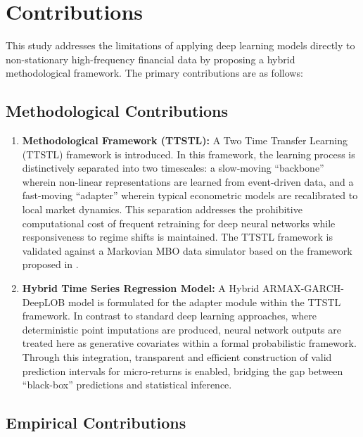 \documentclass[10pt,a4paper,oneside]{article}
\begin{document}
\section{Contributions}
\label{Sect:Contributions}

This study addresses the limitations of applying deep learning models directly to non-stationary high-frequency financial data by proposing a hybrid methodological framework. The primary contributions are as follows:

\subsection{Methodological Contributions}

\begin{enumerate}
    \item \textbf{Methodological Framework (TTSTL):} A Two Time Transfer Learning (TTSTL) framework is introduced. In this framework, the learning process is distinctively separated into two timescales: a slow-moving ``backbone'' wherein non-linear representations are learned from event-driven data, and a fast-moving ``adapter'' wherein typical econometric models are recalibrated to local market dynamics. This separation addresses the prohibitive computational cost of frequent retraining for deep neural networks while responsiveness to regime shifts is maintained. The TTSTL framework is validated against a Markovian MBO data simulator based on the framework proposed in \cite{cont2023mathematical}.

    \item \textbf{Hybrid Time Series Regression Model:} A Hybrid ARMAX-GARCH-DeepLOB model is formulated for the adapter module within the TTSTL framework. In contrast to standard deep learning approaches, where deterministic point imputations are produced, neural network outputs are treated here as generative covariates within a formal probabilistic framework. Through this integration, transparent and efficient construction of valid prediction intervals for micro-returns is enabled, bridging the gap between ``black-box'' predictions and statistical inference.
\end{enumerate}

\subsection{Empirical Contributions}
\end{document}
